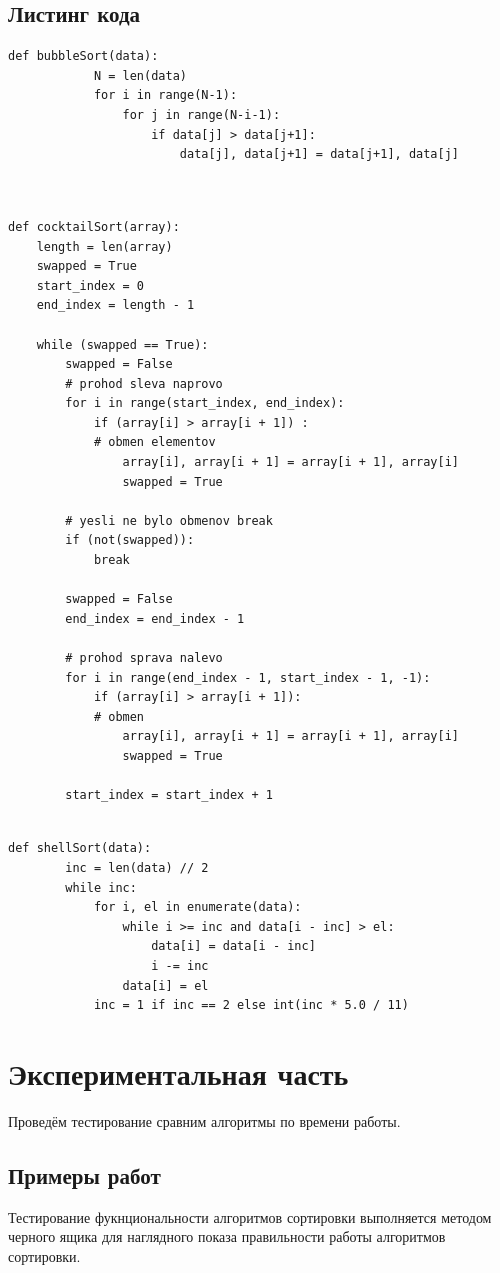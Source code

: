 \documentclass[a4paper]{article}
\begin{document}
	\subsection{Листинг кода}
	
	\begin{lstlisting}[label = bubble, caption = Сортировка пузырьком]
		def bubbleSort(data):
			N = len(data)
			for i in range(N-1):
				for j in range(N-i-1):
					if data[j] > data[j+1]:
						data[j], data[j+1] = data[j+1], data[j]
		
		
	\end{lstlisting}

	
	\begin{lstlisting}[label = shaker, caption = Шейкер-сортировка]
def cocktailSort(array): 
	length = len(array) 
	swapped = True
	start_index = 0
	end_index = length - 1
	
	while (swapped == True): 
		swapped = False
		# prohod sleva naprovo
		for i in range(start_index, end_index): 
			if (array[i] > array[i + 1]) : 
			# obmen elementov
				array[i], array[i + 1] = array[i + 1], array[i] 
				swapped = True
	
		# yesli ne bylo obmenov break
		if (not(swapped)): 
			break
	
		swapped = False
		end_index = end_index - 1
	
		# prohod sprava nalevo
		for i in range(end_index - 1, start_index - 1, -1): 
			if (array[i] > array[i + 1]): 
			# obmen
				array[i], array[i + 1] = array[i + 1], array[i] 
				swapped = True
	
		start_index = start_index + 1
	
	\end{lstlisting}


	\begin{lstlisting}[label = shell, caption = Сортировка Шелла]
	def shellSort(data):
		inc = len(data) // 2
		while inc:
			for i, el in enumerate(data):
				while i >= inc and data[i - inc] > el:
					data[i] = data[i - inc]
					i -= inc
				data[i] = el
			inc = 1 if inc == 2 else int(inc * 5.0 / 11)
	\end{lstlisting}
	\clearpage
	\section{Экспериментальная часть}
	Проведём тестирование сравним алгоритмы по времени работы.
	
	\subsection{Примеры работ}
	Тестирование фукнциональности алгоритмов сортировки выполняется методом черного ящика для наглядного показа правильности работы алгоритмов сортировки.
	
\end{document}
